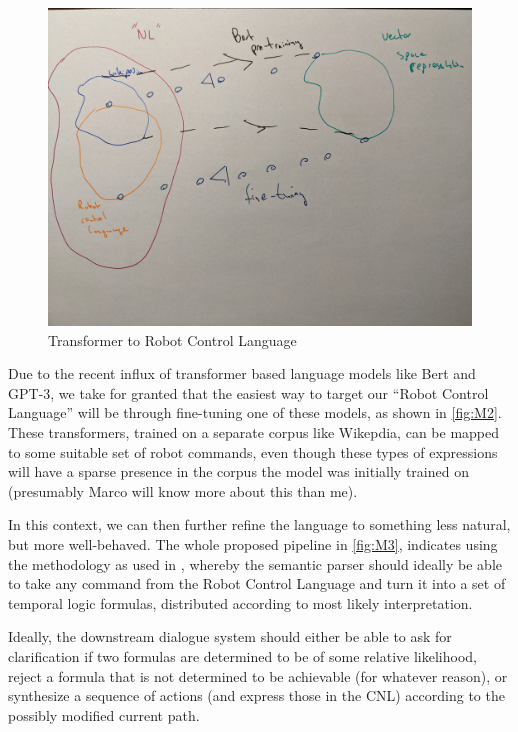 \documentclass[a4paper, 11pt]{article}
\begin{document}
\begin{figure}
\centering
\includegraphics[width=150mm]{pics/two.jpg}
\caption{Transformer to Robot Control Language}\label{fig:M2}
\end{figure}

Due to the recent influx of transformer based language models like Bert and
GPT-3, we take for granted that the easiest way to target our ``Robot Control
Language'' will be through fine-tuning one of these models, as shown in
\autoref{fig:M2}. These transformers, trained on a separate corpus like
Wikepdia, can be mapped to some suitable set of robot commands, even though
these types of expressions will have a sparse presence in the corpus the model
was initially trained on (presumably Marco will know more about this than me).

In this context, we can then further refine the language to something less
natural, but more well-behaved. The whole proposed pipeline in \autoref{fig:M3},
indicates using the methodology as used in \cite{fewShotSem}, whereby the
semantic parser should ideally be able to take any command from the Robot
Control Language and turn it into a set of temporal logic formulas, distributed
according to most likely interpretation.

Ideally, the downstream dialogue system should either be able to ask for
clarification if two formulas are determined to be of some relative likelihood,
reject a formula that is not determined to be achievable (for whatever reason),
or synthesize a sequence of actions (and express those in the CNL) according to
the possibly modified current path.
\end{document}
